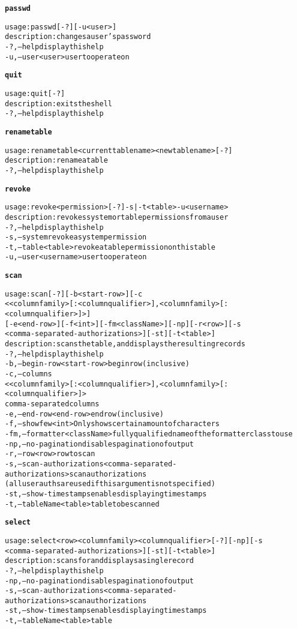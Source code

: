 \begin{alltt}
\textbf{passwd}

    usage: passwd [-?] [-u <user>]
    description: changes a user's password
      -?,--help  display this help
      -u,--user <user>  user to operate on

\textbf{quit}

    usage: quit [-?]
    description: exits the shell
      -?,--help  display this help

\textbf{renametable}

    usage: renametable <current table name> <new table name> [-?]
    description: rename a table
      -?,--help  display this help

\textbf{revoke}

    usage: revoke <permission> [-?] -s | -t <table>  -u <username>
    description: revokes system or table permissions from a user
      -?,--help  display this help
      -s,--system  revoke a system permission
      -t,--table <table>  revoke a table permission on this table
      -u,--user <username>  user to operate on

\textbf{scan}

    usage: scan [-?] [-b <start-row>] [-c
              <<columnfamily>[:<columnqualifier>]{,<columnfamily>[:<columnqualifier>]}>]
              [-e <end-row>] [-f <int>] [-fm <className>] [-np] [-r <row>] [-s
              <comma-separated-authorizations>] [-st] [-t <table>]
    description: scans the table, and displays the resulting records
      -?,--help  display this help
      -b,--begin-row <start-row>  begin row (inclusive)
      -c,--columns
              <<columnfamily>[:<columnqualifier>]{,<columnfamily>[:<columnqualifier>]}> 
              comma-separated columns
      -e,--end-row <end-row>  end row (inclusive)
      -f,--show few <int>  Only shows certain amount of characters
      -fm,--formatter <className>  fully qualified name of the formatter class to use
      -np,--no-pagination  disables pagination of output
      -r,--row <row>  row to scan
      -s,--scan-authorizations <comma-separated-authorizations>  scan authorizations
              (all user auths are used if this argument is not specified)
      -st,--show-timestamps  enables displaying timestamps
      -t,--tableName <table>  table to be scanned

\textbf{select}

    usage: select <row> <columnfamily> <columnqualifier> [-?] [-np] [-s
              <comma-separated-authorizations>] [-st] [-t <table>]
    description: scans for and displays a single record
      -?,--help  display this help
      -np,--no-pagination  disables pagination of output
      -s,--scan-authorizations <comma-separated-authorizations>  scan authorizations
      -st,--show-timestamps  enables displaying timestamps
      -t,--tableName <table>  table


\end{alltt}
